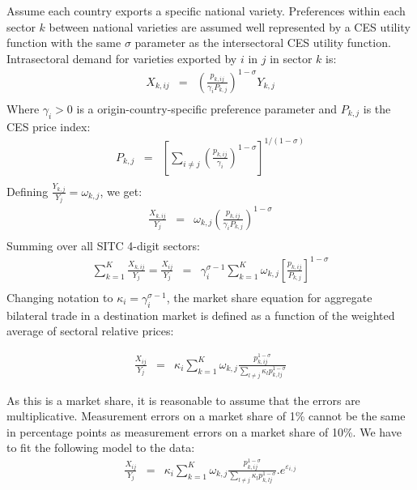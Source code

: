 \documentclass[12pt,twoside,a4paper,notitlepage]{article}
\begin{document}
 Assume each country exports a specific national variety.
Preferences within each sector $k$ between national varieties are assumed well represented by a CES utility function with the same $\sigma $ parameter as the intersectoral CES utility function.
Intrasectoral demand for varieties exported by $i$ in $j$ in sector $k$ is: 
\[\begin{array}{*{35}{l}}
   {{X}_{k,ij}} & = & {{\left( \frac{{{p}_{k,ij}}}{{{\gamma }_{i}}{{P}_{k,j}}} \right)}^{1-\sigma }}{{Y}_{k,j}}  \\
\end{array}\]
Where ${{\gamma }_{i}}>0$ is a origin-country-specific preference parameter and ${{P}_{k,j}}$ is the CES price index:
\[\begin{array}{*{35}{l}}
   {{P}_{k,j}} & = & {{\left[ \sum\limits_{i\ne j}{{{\left( \frac{{{p}_{k,ij}}}{{{\gamma }_{i}}} \right)}^{1-\sigma }}} \right]}^{1/(1-\sigma )}}  \\
\end{array}\]
  Defining $\frac{{{Y}_{k,j}}}{{{Y}_{j}}}={{\omega }_{k,j}}$, we get: 
\[\begin{array}{*{35}{l}}
   \frac{{{X}_{k,ij}}}{{{Y}_{j}}} & = & {{\omega }_{k,j}}{{\left( \frac{{{p}_{k,ij}}}{{{\gamma }_{i}}{{P}_{k,j}}} \right)}^{1-\sigma }}  \\
\end{array}\]
 Summing over all SITC 4-digit sectors: 
\[\begin{array}{*{35}{l}}
   \sum\limits_{k=1}^{K}{\frac{{{X}_{k,ij}}}{{{Y}_{j}}}}=\frac{{{X}_{ij}}}{{{Y}_{j}}} & = & \gamma _{i}^{\sigma -1}\sum\limits_{k=1}^{K}{{{\omega }_{k,j}}}{{\left[ \frac{{{p}_{k,ij}}}{{{P}_{k,j}}} \right]}^{1-\sigma }}  \\
\end{array}\]
Changing notation to $\kappa_i=\gamma_i^{\sigma-1}$, the market share equation for aggregate bilateral trade in a destination market is defined as a function of the weighted average of sectoral relative prices: 

\begin{eqnarray}
   \frac{{{X}_{ij}}}{{{Y}_{j}}} & = & {{\kappa }_{i}}\sum\limits_{k=1}^{K}{{{\omega }_{k,j}}}\frac{p_{k,ij}^{1-\sigma }}{\sum\limits_{l\ne j}{{{\kappa }_{l}}}p_{k,lj}^{1-\sigma }}  
\end{eqnarray}

As this is a market share, it is reasonable to assume that the errors are multiplicative.
Measurement errors on a market share of 1\% cannot be the same in percentage points as measurement errors on a market share of 10\%.
We have to fit the following model to the data:
\begin{eqnarray}
   \frac{{{X}_{ij}}}{{{Y}_{j}}} & = & {{\kappa }_{i}}\sum\limits_{k=1}^{K}{{{\omega }_{k,j}}}\frac{p_{k,ij}^{1-\sigma }}{\sum\limits_{l\ne j}{{{\kappa }_{l}}}p_{k,lj}^{1-\sigma }}.{{e}^{{{\varepsilon }_{i,j}}}}
  \end{eqnarray}
\end{document}
